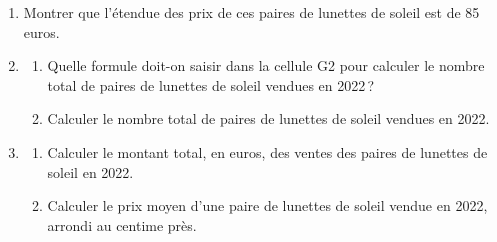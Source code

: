 \documentclass[a4paper,12pt]{article}
\newcommand{\exercice}[2]{%
  \newpage
  \noindent{\Large\bfseries Exercice #1\hspace{0.3em}{\normalfont\normalsize(#2 points)}}%
  \par\vspace{0.7cm}%
}
\begin{document}
\medskip

\begin{enumerate}[itemsep=4pt]
  \item Montrer que l'étendue des prix de ces paires de lunettes de soleil est de 85 euros.
  \item
  \begin{enumerate}[label=\alph*., itemsep=3pt]
    \item Quelle formule doit-on saisir dans la cellule G2 pour calculer le nombre total de paires de lunettes de soleil vendues en 2022\,?
    \item Calculer le nombre total de paires de lunettes de soleil vendues en 2022.
  \end{enumerate}
  \item
  \begin{enumerate}[label=\alph*., itemsep=3pt]
    \item Calculer le montant total, en euros, des ventes des paires de lunettes de soleil en 2022.
    \item Calculer le prix moyen d'une paire de lunettes de soleil vendue en 2022, arrondi au centime près.
  \end{enumerate}
\end{enumerate}

\exercice{6}{4}
\end{document}
